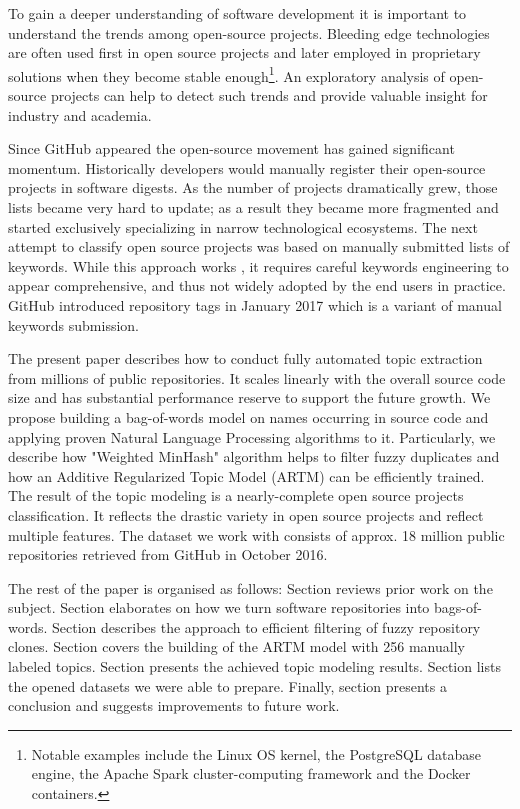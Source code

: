 \documentclass[conference,10pt]{IEEEtran}
\begin{document}
To gain a deeper understanding of software development it is important to understand the trends among open-source projects. Bleeding edge technologies are often used first in open source projects and later employed in proprietary solutions when they become stable enough\footnote{Notable examples include the Linux OS kernel, the PostgreSQL database engine, the Apache Spark cluster-computing framework and the Docker containers.}. An exploratory analysis of open-source projects can help to detect such trends and provide valuable insight for industry and academia. 

Since GitHub appeared the open-source movement has gained significant momentum. Historically developers would manually register their open-source projects in software digests. As the number of projects dramatically grew, those lists became very hard to update; as a result they became more fragmented and started exclusively specializing in narrow technological ecosystems. The next attempt to classify open source projects was based on manually submitted lists of keywords. While this approach works \cite{sourceforge}, it requires careful keywords engineering to appear comprehensive, and thus not widely adopted by the end users in practice. GitHub introduced repository tags in January 2017 which is a variant of manual keywords submission.

The present paper describes how to conduct fully automated topic extraction from millions of public repositories. It scales linearly with the overall source code size and has substantial performance reserve to support the future growth. We propose building a bag-of-words model on names occurring in  source code and applying proven Natural Language Processing algorithms to it. Particularly, we describe how "Weighted MinHash" algorithm \cite{Ioffe:2010:ICS:1933307.1934593} helps to filter fuzzy duplicates and how an Additive Regularized Topic Model (ARTM) \cite{Vorontsov2015} can be efficiently trained. The result of the topic modeling is a nearly-complete open source projects classification. It reflects the drastic variety in open source projects and reflect multiple features. The dataset we work with consists of approx. 18 million public repositories retrieved from GitHub in October 2016.

The rest of the paper is organised as follows: Section  reviews prior work on the subject. Section  elaborates on how we turn software repositories into bags-of-words. Section  describes the approach to efficient filtering of fuzzy repository clones. Section  covers the building of the ARTM model with 256 manually labeled topics. Section  presents the achieved topic modeling results. Section  lists the opened datasets we were able to prepare. Finally, section  presents a conclusion and suggests improvements to future work.
\end{document}
